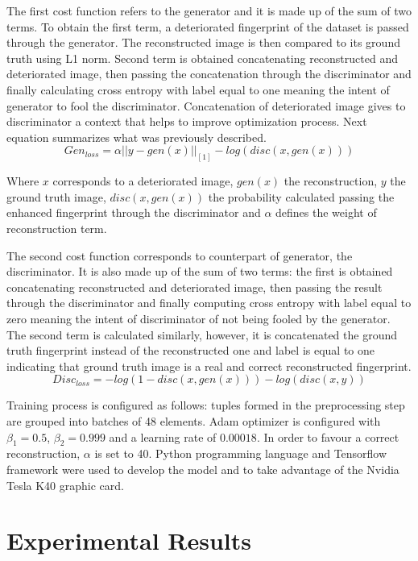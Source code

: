 \documentclass[a4paper,fleqn]{cas-dc}
\begin{document}
The first cost function refers to the generator and it is made up of the sum of two terms. To obtain the first term, a deteriorated fingerprint of the dataset is passed through the generator. The reconstructed image is then compared to its ground truth using L1 norm. Second term is obtained concatenating reconstructed and deteriorated image, then passing the concatenation through the discriminator and finally calculating cross entropy with label equal to one meaning the intent of generator to fool the discriminator. Concatenation of deteriorated image gives to discriminator a context that helps to improve optimization process. Next equation summarizes what was previously described.
\begin{equation}
    Gen_{loss} = \alpha||y-gen(x)||_{[1]} - log(disc(x,gen(x)))
\end{equation}

Where $x$ corresponds to a deteriorated image, $gen(x)$ the reconstruction, $y$ the ground truth image, $disc(x,gen(x))$ the probability calculated passing the enhanced fingerprint through the discriminator and $\alpha$ defines the weight of reconstruction term.

The second cost function corresponds to counterpart of generator, the discriminator. It is also made up of the sum of two terms: the first is obtained concatenating reconstructed and deteriorated image, then passing the result through the discriminator and finally computing cross entropy with label equal to zero meaning the intent of discriminator of not being fooled by the generator. The second term is calculated similarly, however, it is concatenated the ground truth fingerprint instead of the reconstructed one and label is equal to one indicating that ground truth image is a real and correct reconstructed fingerprint.
\begin{equation}
    Disc_{loss} = -log(1-disc(x,gen(x)))-log(disc(x,y))
\end{equation}

Training process is configured as follows: tuples formed in the preprocessing step are grouped into batches of 48 elements. Adam optimizer is configured with $\beta_{1}=0.5$, $\beta_{2}=0.999$ and a learning rate of $0.00018$. In order to favour a correct reconstruction, $\alpha$ is set to 40. Python programming language  and Tensorflow framework were used to develop the model and to take advantage of the Nvidia Tesla K40 graphic card.

\section{Experimental Results}
\label{sec:ER}
\end{document}
